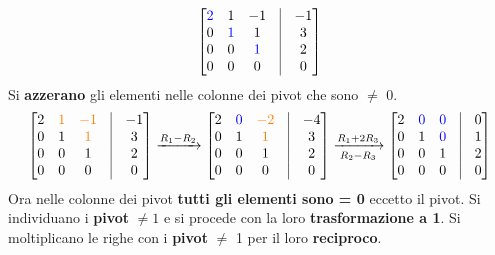 \documentclass[a4paper, 12pt]{report}
\begin{document}
                    $$
                    \begin{bmatrix}
                        \textcolor{blue}{2} & 1 & -1 & \vline & -1\\
                        0 & \textcolor{blue}{1} & 1 & \vline & 3\\
                        0 & 0 & \textcolor{blue}{1} & \vline & 2\\
                        0 & 0 & 0 & \vline & 0
                    \end{bmatrix}
                    $$
                    Si \textbf{azzerano} gli elementi nelle colonne dei pivot che sono $\neq$ 0.
                    $$
                    \begin{bmatrix}
                        2 & \textcolor{orange}{1} & \textcolor{orange}{-1} & \vline & -1\\
                        0 & 1 & \textcolor{orange}{1} & \vline & 3\\
                        0 & 0 & 1 & \vline & 2\\
                        0 & 0 & 0 & \vline & 0
                    \end{bmatrix}
                    \xrightarrow[]{R_1-R_2}
                    \begin{bmatrix}
                        2 & \textcolor{blue}{0} & \textcolor{orange}{-2} & \vline & -4\\
                        0 & 1 & \textcolor{orange}{1} & \vline & 3\\
                        0 & 0 & 1 & \vline & 2\\
                        0 & 0 & 0 & \vline & 0
                    \end{bmatrix}
                    \xrightarrow[R_2-R_3]{R_1+2R_3}
                    \begin{bmatrix}
                        2 & \textcolor{blue}{0} & \textcolor{blue}{0} & \vline & 0\\
                        0 & 1 & \textcolor{blue}{0} & \vline & 1\\
                        0 & 0 & 1 & \vline & 2\\
                        0 & 0 & 0 & \vline & 0
                    \end{bmatrix}
                    $$
                    Ora nelle colonne dei pivot \textbf{tutti gli elementi sono = 0} eccetto il pivot.
                    Si individuano i \textbf{pivot} $\neq 1$ e si procede con la loro \textbf{trasformazione a 1}.
                    Si moltiplicano le righe con i \textbf{pivot} $\neq$ 1 per il loro \textbf{reciproco}.
\end{document}
